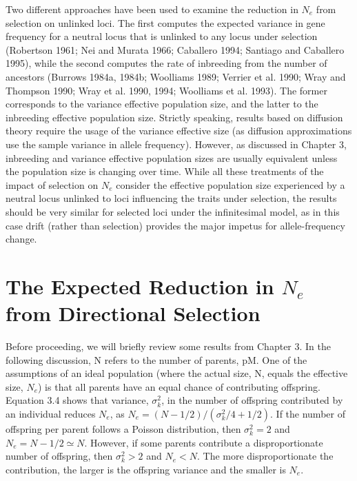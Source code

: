 \documentclass{article}
\begin{document}
Two different approaches have been used to examine the reduction in  $ N_{e} $ from selection on unlinked loci. The first computes the expected variance in gene frequency for a neutral locus that is unlinked to any locus under selection (Robertson 1961; Nei and Murata 1966; Caballero 1994; Santiago and Caballero 1995), while the second computes the rate of inbreeding from the number of ancestors (Burrows 1984a, 1984b; Woolliams 1989; Verrier et al. 1990; Wray and Thompson 1990; Wray et al. 1990, 1994; Woolliams et al. 1993). The former corresponds to the variance effective population size, and the latter to the inbreeding effective population size. Strictly speaking, results based on diffusion theory require the usage of the variance effective size (as diffusion approximations use the sample variance in allele frequency). However, as discussed in Chapter 3, inbreeding and variance effective population sizes are usually equivalent unless the population size is changing over time. While all these treatments of the impact of selection on  $ N_{e} $ consider the effective population size experienced by a neutral locus unlinked to loci influencing the traits under selection, the results should be very similar for selected loci under the infinitesimal model, as in this case drift (rather than selection) provides the major impetus for allele-frequency change.

\section{The Expected Reduction in  $ N_{e} $ from Directional Selection}
Before proceeding, we will briefly review some results from Chapter 3. In the following discussion, N refers to the number of parents, pM. One of the assumptions of an ideal population (where the actual size, N, equals the effective size,  $ N_e $) is that all parents have an equal chance of contributing offspring. Equation 3.4 shows that variance,  $ \sigma_k^2 $, in the number of offspring contributed by an individual reduces  $ N_e $, as  $ N_e = (N - 1/2)/(\sigma_k^2/4 + 1/2) $. If the number of offspring per parent follows a Poisson distribution, then  $ \sigma_k^2 = 2 $ and  $ N_e = N - 1/2 \simeq N $. However, if some parents contribute a disproportionate number of offspring, then  $ \sigma_k^2 > 2 $ and  $ N_e < N $. The more disproportionate the contribution, the larger is the offspring variance and the smaller is  $ N_e $.
\end{document}
